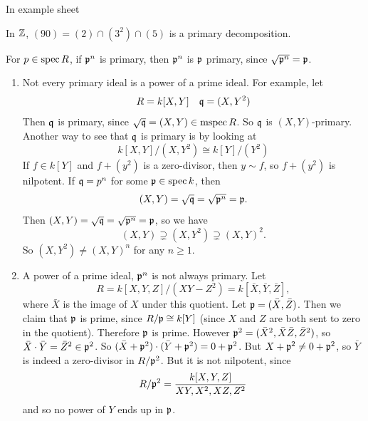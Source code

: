 \documentclass{article}
\begin{document}
\proof In example sheet
\begin{ex*}

    In $\mathbb{Z}$, $(90) = (2) \cap (3^{2}) \cap (5)$ is a primary decomposition.
\end{ex*}
\begin{exs*}
    For $p \in \operatorname{spec} R$, if $\mathfrak{p}^{n}$ is primary, then $\mathfrak{p}^{n}$ is $\mathfrak{p}$ primary, since $\sqrt{\mathfrak{p}^{n}} = \mathfrak{p}$.
    \begin{enumerate}
        \item Not every primary ideal is a power of a prime ideal. For example, let \begin{align*}
            R = k[X,Y] & & \mathfrak{q} = (X,Y^{2})
        \end{align*}
        Then $\mathfrak{q}$ is primary, since $\sqrt{\mathfrak{q}} = (X,Y) \in \operatorname{mspec} R$. So $\mathfrak{q}$ is $(X,Y)$-primary.\gap
        Another way to see that $\mathfrak{q}$ is primary is by looking at \[k[X,Y]/(X,Y^{2}) \cong k[Y]/(Y^{2})\]
        If $f \in k[Y]$ and $f+(y^{2})$ is a zero-divisor, then $y \sim f$, so $f + (y^{2})$ is nilpotent.
        If $\mathfrak{q} = p^{n}$ for some $\mathfrak{p} \in \operatorname{spec} k$, then \[(X,Y) = \sqrt{\mathfrak{q}} = \sqrt{\mathfrak{p}^{n}} = \mathfrak{p}.\]
        Then $(X,Y) = \sqrt{\mathfrak{q}} = \sqrt{\mathfrak{p}^{n}} = \mathfrak{p}$, so we have \[ (X,Y) \supsetneq (X,Y^{2}) \supsetneq (X,Y)^{2}.\]
        So $(X,Y^{2}) \neq (X,Y)^{n}$ for any $n \geq 1$.
        \item A power of a prime ideal, $\mathfrak{p}^{n}$ is not always primary. Let \[R = k[X,Y,Z]/(XY-Z^{2}) = k[\bar X, \bar Y, \bar Z],\] where $\bar X$ is the image of $X$ under this quotient. Let $\mathfrak{p} = (\bar X, \bar Z)$. Then we claim that $\mathfrak{p}$ is prime, since $R/\mathfrak{p} \cong k[Y]$ (since $X$ and $Z$ are both sent to zero in the quotient). Therefore $\mathfrak{p}$ is prime. However $\mathfrak{p}^{2} = (\bar{X}^{2}, \bar X \bar Z, \bar{Z}^{2})$, so $\bar X \cdot \bar Y = \bar{Z}^{2} \in \mathfrak{p}^{2}$. So $(\bar X + \mathfrak{p}^{2})\cdot (\bar Y + \mathfrak{p}^{2}) = 0 + \mathfrak{p}^{2}$. But $X + \mathfrak{p}^{2} \neq 0 + \mathfrak{p}^{2}$, so $\bar Y$ is indeed a zero-divisor in $R/\mathfrak{p}^{2}$. But it is not nilpotent, since \[ R/\mathfrak{p}^{2} = \frac{k[X,Y,Z]}{XY, X^{2}, XZ, Z^{2}}\] and so no power of $Y$ ends up in $\mathfrak{p}$.
    \end{enumerate}
\end{exs*}
\end{document}
